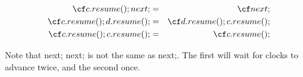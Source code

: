 \begin{eqnarray}
 {\cf c.resume(); next;}       &=& {\cf next;}\\
 {\cf c.resume(); d.resume();} &=& {\cf d.resume(); c.resume();}\\
 {\cf c.resume(); c.resume();} &=&  {\cf c.resume();}
\end{eqnarray}

Note that {\cf next; next;} is not the same as {\cf next;}. The
first will wait for clocks to advance twice, and the second
once.  

\cbend

